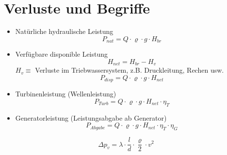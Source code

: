 \documentclass[a4,paper,fleqn]{article}
\begin{document}
\section{Verluste und Begriffe}
\begin{itemize}
    \item Natürliche hydraulische Leistung
        \[ P_{nat} = Q \cdot \varrho \cdot g \cdot H_{br} \]
    \item Verfügbare disponible Leistung
        \[ H_{net} = H_{br} - H_{v} \]
        $H_{v} \equiv$ Verluste im Triebwassersystem, z.B. Druckleitung, 
        Rechen usw. 
        \[ P_{disp} = Q \cdot \varrho \cdot g \cdot H_{net} \]
    \item Turbinenleistung (Wellenleistung)
        \[ P_{Turb} = Q \cdot \varrho \cdot g \cdot H_{net} \cdot \eta_{T} \]
    \item Generatorleistung (Leistungsabgabe ab Generator)
        \[ \boxed{P_{Abgabe} = Q \cdot \varrho \cdot g \cdot H_{net} \cdot \eta_{T} \cdot \eta_{G}} \]
\end{itemize}
\[ \Delta p_v = \lambda \cdot \frac{l}{d} \cdot \frac{\varrho}{2} \cdot v^2 \]
\end{document}
